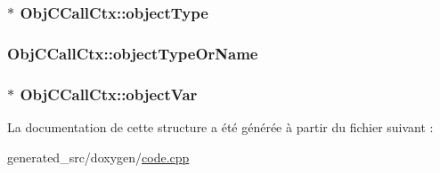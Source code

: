 \subsubsection[{object\+Type}]{$\ast$ Obj\+C\+Call\+Ctx\+::object\+Type}\label{struct_obj_c_call_ctx_ad7d8cfa217a374e1c9bd04b4e56c5116}
\hypertarget{struct_obj_c_call_ctx_a4ffd01a3580f6fdebef2c91cf801b878}{}
\subsubsection[{object\+Type\+Or\+Name}]{ Obj\+C\+Call\+Ctx\+::object\+Type\+Or\+Name}\label{struct_obj_c_call_ctx_a4ffd01a3580f6fdebef2c91cf801b878}
\hypertarget{struct_obj_c_call_ctx_aa6bf125d3fbb6558b0c8f8f1653044c2}{}
\subsubsection[{object\+Var}]{$\ast$ Obj\+C\+Call\+Ctx\+::object\+Var}\label{struct_obj_c_call_ctx_aa6bf125d3fbb6558b0c8f8f1653044c2}


La documentation de cette structure a été générée à partir du fichier suivant \+:\begin{DoxyCompactItemize}
\item 
generated\+\_\+src/doxygen/\hyperlink{code_8cpp}{code.\+cpp}\end{DoxyCompactItemize}

